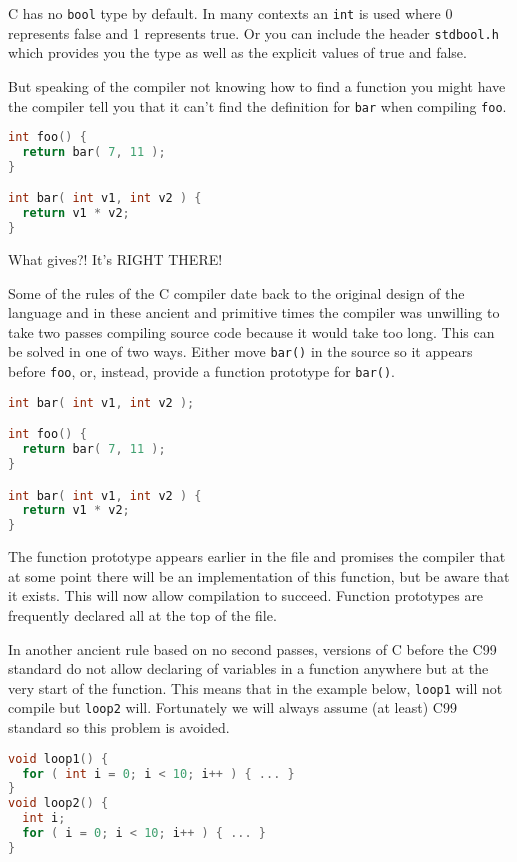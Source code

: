 C has no \texttt{bool} type by default. In many contexts an \texttt{int} is used where 0 represents false and 1 represents true. Or you can include the header \texttt{stdbool.h}  which provides you the type as well as the explicit values of true and false.

But speaking of the compiler not knowing how to find a function you might have the compiler tell you that it can't find the definition for \texttt{bar} when compiling \texttt{foo}.

\begin{lstlisting}[language=C]
int foo() {
  return bar( 7, 11 );
}

int bar( int v1, int v2 ) {
  return v1 * v2;
} 
\end{lstlisting}

What gives?! It's RIGHT THERE!

Some of the rules of the C compiler date back to the original design of the language and in these ancient and primitive times the compiler was unwilling to take two passes compiling source code because it would take too long. This can be solved in one of two ways. Either move \texttt{bar()} in the source so it appears before \texttt{foo}, or, instead, provide a function prototype for \texttt{bar()}.

\begin{lstlisting}[language=C]
int bar( int v1, int v2 );

int foo() {
  return bar( 7, 11 );
}

int bar( int v1, int v2 ) {
  return v1 * v2;
} 
\end{lstlisting}

The function prototype appears earlier in the file and promises the compiler that at some point there will be an implementation of this function, but be aware that it exists. This will now allow compilation to succeed. Function prototypes are frequently declared all at the top of the file.

In another ancient rule based on no second passes, versions of C before the C99 standard do not allow declaring of variables in a function anywhere but at the very start of the function. This means that in the example below, \texttt{loop1} will not compile but \texttt{loop2} will.  Fortunately we will always assume (at least) C99 standard so this problem is avoided.

\begin{lstlisting}[language=C]
void loop1() {
  for ( int i = 0; i < 10; i++ ) { ... }
}
void loop2() {
  int i;
  for ( i = 0; i < 10; i++ ) { ... }
}
\end{lstlisting}

